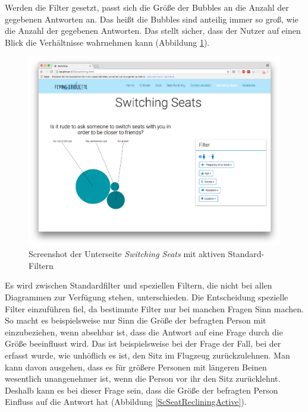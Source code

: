\documentclass{mi-seminar}
\begin{document}
Werden die Filter gesetzt, passt sich die Größe der Bubbles an die Anzahl der gegebenen Antworten an. Das heißt die Bubbles sind anteilig immer so groß, wie die Anzahl der gegebenen Antworten. Das stellt sicher, dass der Nutzer auf einen Blick die Verhältnisse wahrnehmen kann (Abbildung \ref{ScSwitchingSeatsActive}).  
\begin{figure}[h]
\includegraphics[scale=0.5]{assets/filter_standard_active.png}
\caption{Screenshot der Unterseite \textit{Switching Seats} mit aktiven Standard-Filtern}
\label{ScSwitchingSeatsActive}
\end{figure}
Es wird zwischen Standardfilter und speziellen Filtern, die nicht bei allen Diagrammen zur Verfügung stehen, unterschieden. Die Entscheidung spezielle Filter einzuführen fiel, da bestimmte Filter nur bei manchen Fragen Sinn machen. So macht es beispielsweise nur Sinn die Größe der befragten Person mit einzubeziehen, wenn absehbar ist, dass die Antwort auf eine Frage durch die Größe beeinflusst wird. Das ist beispielsweise bei der Frage der Fall, bei der erfasst wurde, wie unhöflich es ist, den Sitz im Flugzeug zurückzulehnen. Man kann davon ausgehen, dass es für größere Personen mit längeren Beinen wesentlich unangenehmer ist, wenn die Person vor ihr den Sitz zurücklehnt. Deshalb kann es bei dieser Frage sein, dass die Größe der befragten Person Einfluss auf die Antwort hat (Abbildung \ref{ScSeatRecliningActive}).
\end{document}
